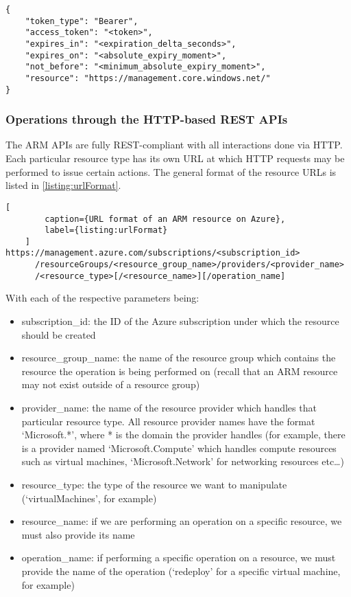 \documentclass[11pt]{report}
\begin{document}
\begin{listing}[H]
\caption{Structure of token response.}
\label{listing:tokenResponse}
\begin{verbatim}
{
    "token_type": "Bearer",
    "access_token": "<token>",
    "expires_in": "<expiration_delta_seconds>",
    "expires_on": "<absolute_expiry_moment>",
    "not_before": "<minimum_absolute_expiry_moment>",
    "resource": "https://management.core.windows.net/"
}
\end{verbatim}
\end{listing}

\subsubsection{Operations through the HTTP-based REST APIs}

The ARM APIs are fully REST-compliant with all interactions done via HTTP\@. Each
particular resource type has its own URL at which HTTP requests may be
performed to issue certain actions. The general format of the resource URLs is
listed in \autoref{listing:urlFormat}.

\begin{lstlisting}[
        caption={URL format of an ARM resource on Azure},
        label={listing:urlFormat}
    ]
https://management.azure.com/subscriptions/<subscription_id>
      /resourceGroups/<resource_group_name>/providers/<provider_name>
      /<resource_type>[/<resource_name>][/operation_name]
\end{lstlisting}

With each of the respective parameters being:

\begin{itemize}
    \item{subscription\_id}: the ID of the Azure subscription under which the
        resource should be created
    \item{resource\_group\_name}: the name of the resource group which contains
        the resource the operation is being performed on (recall that an
        ARM resource may not exist outside of a resource group)
    \item{provider\_name}: the name of the resource provider which handles that
        particular resource type. All resource provider names have the format
        `Microsoft.*', where * is the domain the provider handles (for
        example, there is a provider named `Microsoft.Compute' which handles
        compute resources such as virtual machines, `Microsoft.Network' for
        networking resources etc\ldots)
    \item{resource\_type}: the type of the resource we want to manipulate
        (`virtualMachines', for example)
    \item{resource\_name}: if we are performing an operation on a specific
        resource, we must also provide its name
    \item{operation\_name}: if performing a specific operation on a resource,
        we must provide the name of the operation (`redeploy' for a specific
        virtual machine, for example)
\end{itemize}
\end{document}
